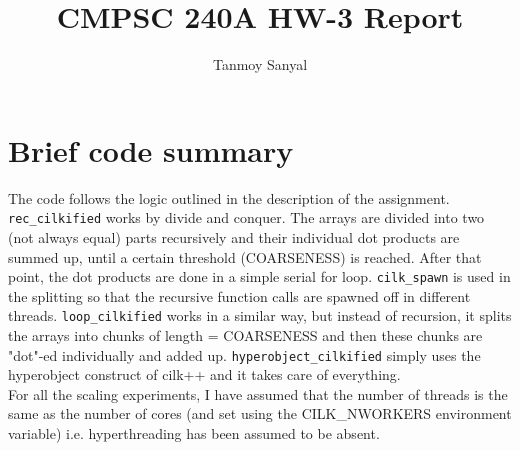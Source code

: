 \documentclass[12pt,letterpaper]{article}
\author{Tanmoy Sanyal}
\title{CMPSC 240A HW-3 Report}
\begin{document}
\maketitle

\section*{Brief code summary}
\noindent The code follows the logic outlined in the description of the assignment. \texttt{rec\_cilkified} works by divide and conquer. The arrays are divided into two (not always equal) parts recursively and their individual dot products are summed up, until a certain threshold (COARSENESS) is reached. After that point, the dot products are done in a simple serial for loop. \texttt{cilk\_spawn} is used in the splitting so that the recursive function calls are spawned off in different threads. \texttt{loop\_cilkified} works in a similar way, but instead of recursion, it splits the arrays into chunks of length = COARSENESS and then these chunks are "dot"-ed individually and added up. \texttt{hyperobject\_cilkified} simply uses the hyperobject construct of cilk++ and it takes care of everything.\\

\noindent For all the scaling experiments, I have assumed that the number of threads is the same as the number of cores (and set using the CILK\_NWORKERS environment variable) i.e. hyperthreading has been assumed to be absent.
\end{document}
